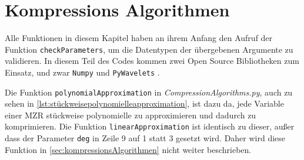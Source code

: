 \section{Kompressions Algorithmen}\label{sec:kompressionsAlgorithmen}
Alle Funktionen in diesem Kapitel haben an ihrem Anfang den Aufruf der Funktion \lstinline|checkParameters|, um die Datentypen der übergebenen Argumente zu validieren. In diesem Teil des Codes kommen zwei Open Source Bibliotheken zum Einsatz, und zwar \lstinline|Numpy| \cite{cksr2020} und \lstinline|PyWavelets| \cite{grfk2019}.

Die Funktion \lstinline|polynomialApproximation| in \textit{CompressionAlgorithms.py}, auch zu sehen in \autoref{lst:stückweisepolynomielleapproximation}, ist dazu da, jede Variable einer \ac{MZR} stückweise polynomielle zu approximieren und dadurch zu komprimieren. Die Funktion \lstinline|linearApproximation| ist identisch zu dieser, außer dass der Parameter \lstinline|deg| in Zeile 9 auf 1 statt 3 gesetzt wird. Daher wird diese Funktion in \autoref{sec:kompressionsAlgorithmen} nicht weiter beschrieben.

